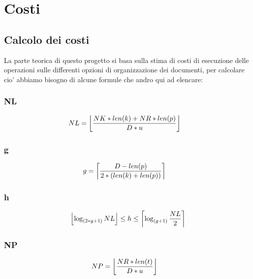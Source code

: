 \chapter{Costi}

\section{Calcolo dei costi}

La parte teorica di questo progetto si basa sulla stima di costi di esecuzione delle operazioni sulle differenti opzioni di organizzazione dei documenti, per calcolare cio' 
abbiamo bisogno di alcune formule che andro qui ad elencare:  

\subsection{NL}
    \begin{equation*}
        \begin{aligned}
        NL &=\floor*{\frac{NK * len(k) + NR * len(p)}{D * u}}
        \end{aligned}
        \end{equation*}
\subsection{g}
    \begin{equation*}
        \begin{aligned}
        g &=\ceil*{\frac{D - len(p)}{2 * (len(k) + len(p))}}
        \end{aligned}
        \end{equation*}
\subsection{h}
    \begin{equation*}
        \begin{aligned}
        \floor*{\log_{(2*g + 1)}{NL}} \leq h \leq \ceil*{\log_{(g + 1)}{\frac{NL}{2}}}
        \end{aligned}
        \end{equation*}
\subsection{NP}
    \begin{equation*}
        \begin{aligned}
        NP &=\floor*{\frac{NR * len(t)}{D * u}}
        \end{aligned}
        \end{equation*}

